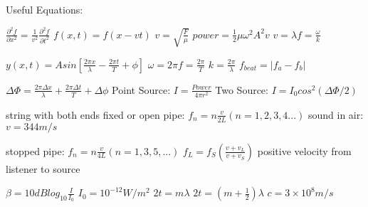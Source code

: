 \documentclass{exam}
\begin{document}
Useful Equations:
\vspace{5mm}

$\frac{\partial^2f}{\partial x^2}=\frac{1}{v^2}\frac{\partial^2f}{\partial t^2}$ 
$f(x,t) = f(x - vt)$
$v=\sqrt{\frac{F}{\mu}}$
$power = \frac{1}{2} \mu \omega^2 A^2 v$
$v = \lambda f = \frac{\omega}{k}$

$y(x,t) = A sin\left[\frac{2\pi x}{\lambda}-\frac{2\pi t}{T}+\phi\right]$
$\omega = 2\pi f = \frac{2\pi}{T}$
$k=\frac{2\pi}{\lambda}$
$f_{beat}=|f_a-f_b|$

$\Delta \Phi = \frac{2\pi \Delta x}{\lambda}+\frac{2\pi \Delta t}{T}+\Delta \phi$
Point Source: $I = \frac{Power}{4\pi r^2}$
Two Source: $I = I_0 cos^2(\Delta \Phi/2)$




string with both ends fixed or open pipe: $f_n=n\frac{v}{2L}(n=1,2,3,4...)$
sound in air: $v=344m/s$

stopped pipe: $f_n = n\frac{v}{4L} (n=1, 3, 5, ...)$
$f_L=f_S\left( \frac{v+v_L}{v+v_S}\right)$ positive velocity from listener to source

$\beta = 10dB log_{10}\frac{I}{I_0}$
\hspace{2mm}
$I_0=10^{-12}W/m^2$
$2t = m\lambda$
\hspace{4mm}
$2t = (m+\frac{1}{2})\lambda$
$c = 3\times10^8m/s$

\end{document}
